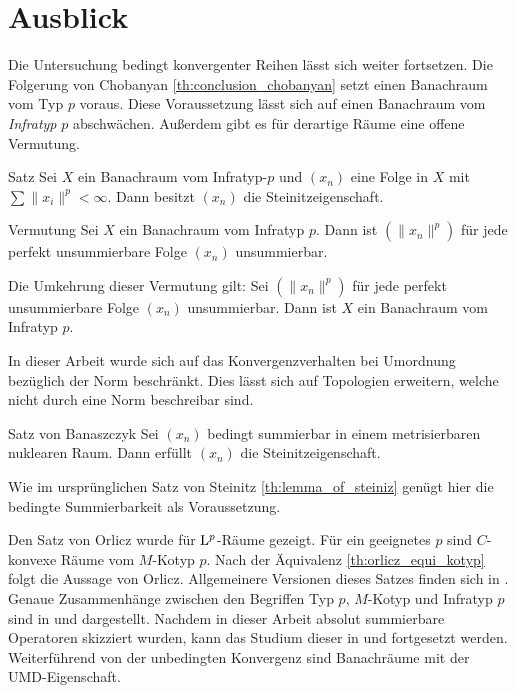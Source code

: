 \chapter{Ausblick}


Die Untersuchung bedingt konvergenter Reihen lässt sich weiter fortsetzen. 
Die Folgerung von Chobanyan \ref{th:conclusion_chobanyan} setzt einen Banachraum vom Typ $ p $ voraus. 
Diese Voraussetzung lässt sich auf einen Banachraum vom \textit{Infratyp} $ p $\cite[Ch. 5]{Kadets1997} abschwächen.
Außerdem gibt es für derartige Räume eine offene Vermutung.
\begin{genericthm_no_num}{Satz\cite[Ch. 7]{Kadets1997}}
	Sei $ X $ ein Banachraum vom Infratyp-$ p $ und $ (x_n) $ eine Folge in $ X $
	mit $ \sum \| x_i \|^p < \infty $.
	Dann besitzt $ (x_n) $ die Steinitzeigenschaft.
\end{genericthm_no_num}
\begin{generic_no_num}{Vermutung\cite[Ch. 7]{Kadets1997}}
	Sei $ X $ ein Banachraum vom Infratyp $ p $.
	Dann ist $ (\|x_n\|^p) $ für jede perfekt unsummierbare Folge $ (x_n) $ unsummierbar.
\end{generic_no_num}
Die Umkehrung dieser Vermutung gilt: 
Sei $ (\|x_n\|^p) $ für jede perfekt unsummierbare Folge $ (x_n) $ unsummierbar. Dann ist $ X $ ein Banachraum vom Infratyp $ p $.


In dieser Arbeit wurde sich auf das Konvergenzverhalten bei Umordnung bezüglich der Norm beschränkt.
Dies lässt sich auf Topologien erweitern, welche nicht durch eine Norm beschreibar sind.
\begin{genericthm_no_num}{Satz von Banaszczyk\cite{Banaszczyk1990}}
	Sei $ (x_n) $ bedingt summierbar in einem metrisierbaren nuklearen Raum.
	Dann erfüllt $ (x_n) $ die Steinitzeigenschaft.
\end{genericthm_no_num}
Wie im ursprünglichen Satz von Steinitz \ref{th:lemma_of_steiniz} genügt hier die bedingte Summierbarkeit als Voraussetzung.

Den Satz von Orlicz wurde für $ \mathrm{L}^p $-Räume gezeigt. 
Für ein geeignetes $ p $ sind $ C $-konvexe Räume\cite[Ch. 5]{Kadets1997} vom $ M $-Kotyp $ p$.
Nach der Äquivalenz \ref{th:orlicz_equi_kotyp} folgt die Aussage von Orlicz.
Allgemeinere Versionen dieses Satzes finden sich in \cite[Ch. 3,Ch. 10, Ch.11]{Diestel1995}.
Genaue Zusammenhänge zwischen den Begriffen Typ $ p $, $ M $-Kotyp und Infratyp $ p $ sind in \cite[Ch. 5]{Kadets1997} und 
\cite[Ch. 11, Ch. 14., Ch. 16]{Diestel1995} dargestellt.
Nachdem in dieser Arbeit absolut summierbare Operatoren skizziert wurden, kann das Studium dieser in \cite[Ch. 8]{Albaic2006} und \cite{Diestel1995} fortgesetzt werden.
Weiterführend von der unbedingten Konvergenz sind Banachräume mit der UMD-Eigenschaft\cite[Ch. 4]{Hytoenen2016}.









